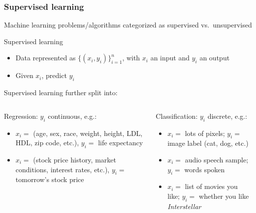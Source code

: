 \begin{frame}
    \frametitle{Supervised learning}

    Machine learning problems/algorithms categorized as \alert{supervised} vs.~\alert{unsupervised}

    \begin{block}{Supervised learning}
        \begin{itemize}
            \item Data represented as $\{(x_i, y_i)\}_{i=1}^n$, with $x_i$ an input and $y_i$ an output
            \item Given $x_i$, predict $y_i$
        \end{itemize}
    \end{block}

    Supervised learning further split into: \\[1ex]
    \begin{columns}[t]
        \begin{column}{0.47\textwidth}
            \alert{Regression}: $y_i$ continuous, e.g.:
            \begin{itemize}
                \item $x_i =$ (age, sex, race, weight, height, LDL, HDL, zip code, etc.), $y_i =$ life expectancy
                \item $x_i =$ (stock price history, market conditions, interest rates, etc.), $y_i =$ tomorrow's stock price
            \end{itemize}
        \end{column}
        \begin{column}{0.45\textwidth}
            \alert{Classification}: $y_i$ discrete, e.g.:
            \begin{itemize}
                \item $x_i =$ lots of pixels; $y_i =$ image label (cat, dog, etc.)
                \item $x_i =$ audio speech sample; $y_i =$ words spoken
                \item $x_i =$ list of movies you like; $y_i =$ whether you like \emph{Interstellar}
            \end{itemize}
        \end{column}
    \end{columns}
\end{frame}


